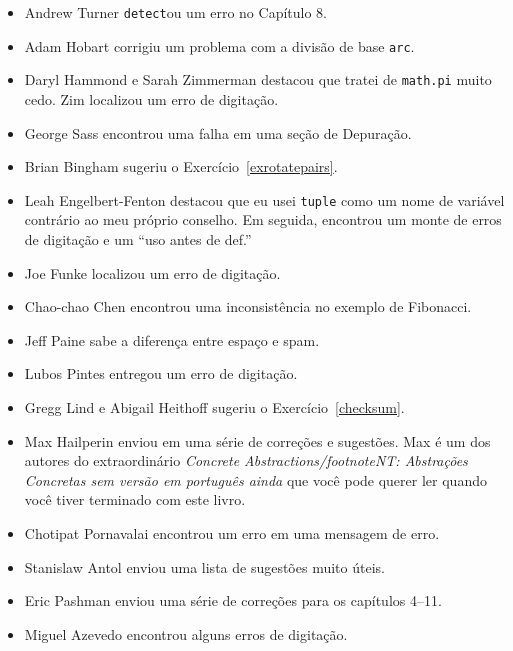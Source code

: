 \documentclass[10pt]{book}
\begin{document}
\begin {itemize}
\item Andrew Turner {\tt detect}ou um erro no Capítulo 8.

\item Adam Hobart corrigiu um problema com a divisão de base {\tt arc}.

\item Daryl Hammond e Sarah Zimmerman destacou que tratei de
{\tt math.pi} muito cedo. Zim localizou um erro de digitação.

\item George Sass encontrou uma falha em uma seção de Depuração.

\item Brian Bingham sugeriu o Exercício~\ref{exrotatepairs}.

\item Leah Engelbert-Fenton destacou que eu usei {\tt tuple}
como um nome de variável contrário ao meu próprio conselho. Em seguida, encontrou
um monte de erros de digitação e um ``uso antes de def.''

\item Joe Funke localizou um erro de digitação.

\item Chao-chao Chen encontrou uma inconsistência no exemplo de Fibonacci.

\item Jeff Paine sabe a diferença entre espaço e spam.

\item Lubos Pintes entregou um erro de digitação.

\item Gregg Lind e Abigail Heithoff sugeriu o Exercício~\ref{checksum}.

\item Max Hailperin enviou em uma série de correções e
sugestões. Max é um dos autores do extraordinário {\em
Concrete Abstractions/footnote{NT: Abstrações Concretas sem versão em português ainda}} que você pode querer ler quando você tiver
terminado com este livro.

\item Chotipat Pornavalai encontrou um erro em uma mensagem de erro.

\item Stanislaw Antol enviou uma lista de sugestões muito úteis.

\item Eric Pashman enviou uma série de correções para os capítulos 4--11.

\item Miguel Azevedo encontrou alguns erros de digitação.


\end{itemize}
\end{document}
